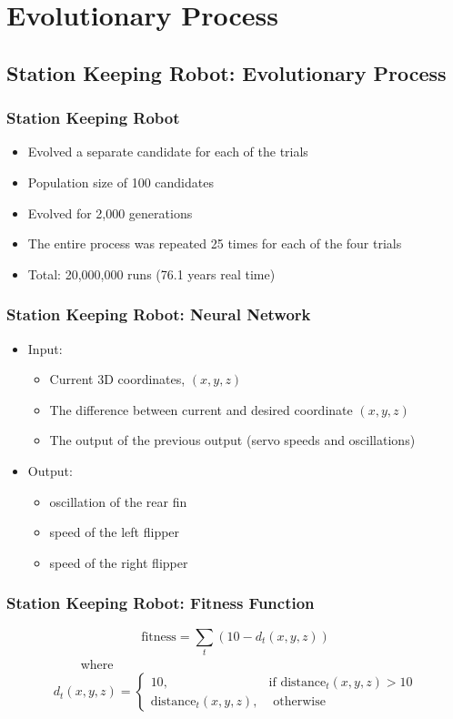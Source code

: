 \documentclass{beamer}
\begin{document}
\section{Evolutionary Process}

\subsection*{Station Keeping Robot: Evolutionary Process}
\begin{frame}
  \frametitle{Station Keeping Robot}
\begin{itemize}
\item Evolved a separate candidate for each of the trials
\item Population size of 100 candidates
\item Evolved for 2,000 generations
\item The entire process was repeated 25 times for each of the four trials
\item Total: 20,000,000 runs (76.1 years real time)
\end{itemize}
\end{frame}

\begin{frame}
  \frametitle{Station Keeping Robot: Neural Network}
\begin{itemize}
\item Input: 
\begin{itemize}
\item Current 3D coordinates, $(x,y,z)$
\item The difference between current and desired coordinate  $(x,y,z)$
\item The output of the previous output (servo speeds and oscillations)
\end{itemize}
\item Output:
\begin{itemize}
\item oscillation of the rear fin
\item speed of the left flipper
\item speed of the right flipper
\end{itemize}
\end{itemize}
\end{frame}

\begin{frame}
  \frametitle{Station Keeping Robot: Fitness Function}
\begin{equation*}
	\textrm{fitness} = \sum_{t} (10 - d_t(x, y, z))
\end{equation*}
~~~~~~~~~~~  where
\[
	d_t(x, y, z) = 
		\begin{cases} 10, & \textrm{if distance}_t(x, y, z) > 10 \\
					  \textrm{distance}_t(x, y, z), & \textrm{ otherwise}
		\end{cases}
\]
\end{frame}
\end{document}
